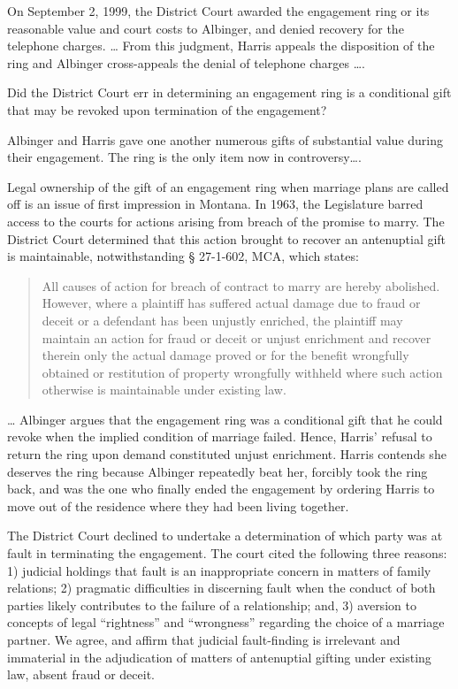 On September 2, 1999, the District Court awarded the engagement ring or its
reasonable value and court costs to Albinger, and denied recovery for the
telephone charges. \dots{} From this judgment, Harris appeals the disposition
of the ring and Albinger cross-appeals the denial of telephone charges \dots{}.

Did the District Court err in determining an engagement ring is a conditional
gift that may be revoked upon termination of the engagement?

Albinger and Harris gave one another numerous gifts of substantial value during
their engagement. The ring is the only item now in controversy\dots{}. 

Legal ownership of the gift of an engagement ring when marriage plans are called
off is an issue of first impression in Montana. In 1963, the Legislature barred
access to the courts for actions arising from breach of the promise to marry.
The District Court determined that this action brought to recover an
antenuptial gift is maintainable, notwithstanding {\S} 27-1-602, MCA, which
states:

\begin{quote}
All causes of action for breach of contract to marry are hereby abolished.
However, where a plaintiff has suffered actual damage due to fraud or deceit or
a defendant has been unjustly enriched, the plaintiff may maintain an action
for fraud or deceit or unjust enrichment and recover therein only the actual
damage proved or for the benefit wrongfully obtained or restitution of property
wrongfully withheld where such action otherwise is maintainable under existing
law.
\end{quote}

\dots{} Albinger argues that the engagement ring was a conditional gift that he
could revoke when the implied condition of marriage failed. Hence, Harris'
refusal to return the ring upon demand constituted unjust enrichment. Harris
contends she deserves the ring because Albinger repeatedly beat her, forcibly
took the ring back, and was the one who finally ended the engagement by
ordering Harris to move out of the residence where they had been living
together.

The District Court declined to undertake a determination of which party was at
fault in terminating the engagement. The court cited the following three
reasons: 1) judicial holdings that fault is an inappropriate concern in matters
of family relations; 2) pragmatic difficulties in discerning fault when the
conduct of both parties likely contributes to the failure of a relationship;
and, 3) aversion to concepts of legal ``rightness'' and ``wrongness'' regarding
the choice of a marriage partner. We agree, and affirm that judicial
fault-finding is irrelevant and immaterial in the adjudication of matters of
antenuptial gifting under existing law, absent fraud or deceit.

